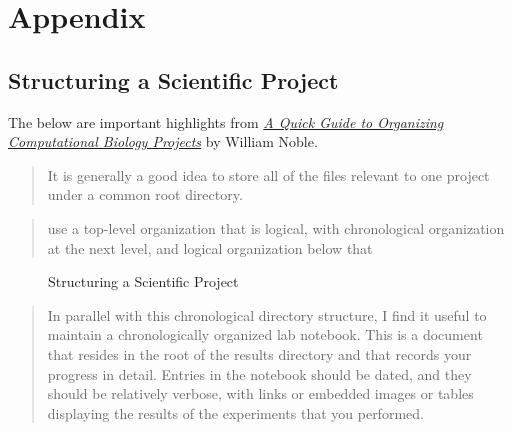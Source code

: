 \documentclass[12pt,]{book}
\begin{document}
\chapter{Appendix}

\section{Structuring a Scientific
Project}\label{structuring-a-scientific-project}

The below are important highlights from
\href{http://journals.plos.org/ploscompbiol/article?id=10.1371/journal.pcbi.1000424\#pcbi-1000424-g001}{\emph{A
Quick Guide to Organizing Computational Biology Projects}} by William
Noble.

\begin{quote}
It is generally a good idea to store all of the files relevant to one
project under a common root directory.
\end{quote}

\begin{quote}
use a top-level organization that is logical, with chronological
organization at the next level, and logical organization below that
\end{quote}

\begin{figure}
\caption{Structuring a Scientific Project}
\end{figure}

\begin{quote}
In parallel with this chronological directory structure, I find it
useful to maintain a chronologically organized lab notebook. This is a
document that resides in the root of the results directory and that
records your progress in detail. Entries in the notebook should be
dated, and they should be relatively verbose, with links or embedded
images or tables displaying the results of the experiments that you
performed.
\end{quote}
\end{document}
